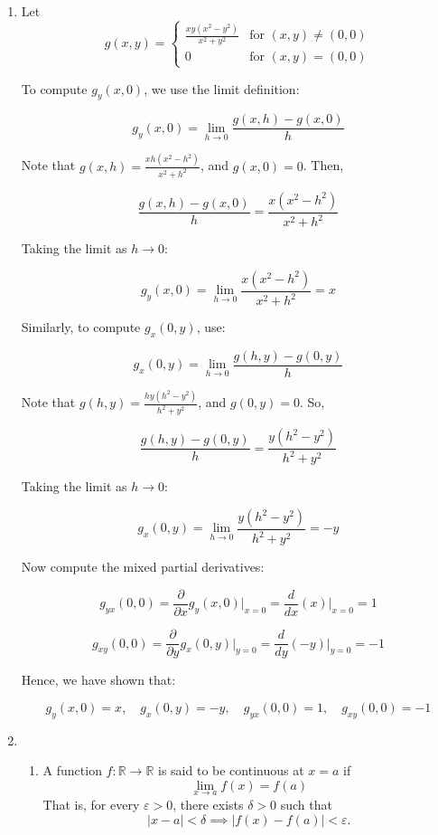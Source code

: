 \documentclass[12pt]{article}
\begin{document}
\begin{enumerate}
\item Let 
\[
g(x, y) = 
\begin{cases}
\frac{xy(x^2 - y^2)}{x^2 + y^2} & \text{for } (x, y) \neq (0, 0) \\
0 & \text{for } (x, y) = (0, 0)
\end{cases}
\]

To compute \( g_y(x, 0) \), we use the limit definition:

\[
g_y(x, 0) = \lim_{h \to 0} \frac{g(x,h) - g(x,0)}{h}
\]

Note that \( g(x, h) = \frac{x h (x^2 - h^2)}{x^2 + h^2} \), and \( g(x, 0) = 0 \). Then,

\[
\frac{g(x,h) - g(x,0)}{h} = \frac{x(x^2 - h^2)}{x^2 + h^2}
\]

Taking the limit as \( h \to 0 \):

\[
g_y(x, 0) = \lim_{h \to 0} \frac{x(x^2 - h^2)}{x^2 + h^2} = x
\]

Similarly, to compute \( g_x(0, y) \), use:

\[
g_x(0, y) = \lim_{h \to 0} \frac{g(h, y) - g(0, y)}{h}
\]

Note that \( g(h, y) = \frac{h y (h^2 - y^2)}{h^2 + y^2} \), and \( g(0, y) = 0 \). So,

\[
\frac{g(h,y) - g(0,y)}{h} = \frac{y(h^2 - y^2)}{h^2 + y^2}
\]

Taking the limit as \( h \to 0 \):

\[
g_x(0, y) = \lim_{h \to 0} \frac{y(h^2 - y^2)}{h^2 + y^2} = -y
\]

Now compute the mixed partial derivatives:

\[
g_{yx}(0, 0) = \frac{\partial}{\partial x} g_y(x, 0) \bigg|_{x = 0} = \frac{d}{dx}(x) \bigg|_{x = 0} = 1
\]

\[
g_{xy}(0, 0) = \frac{\partial}{\partial y} g_x(0, y) \bigg|_{y = 0} = \frac{d}{dy}(-y) \bigg|_{y = 0} = -1
\]

Hence, we have shown that:

\[
g_y(x, 0) = x, \quad g_x(0, y) = -y, \quad g_{yx}(0, 0) = 1, \quad g_{xy}(0, 0) = -1
\]
\item \begin{enumerate}
    \item

    A function \( f : \mathbb{R} \to \mathbb{R} \) is said to be continuous at \( x = a \) if
    \[
    \lim_{x \to a} f(x) = f(a)
    \]
    That is, for every \( \varepsilon > 0 \), there exists \( \delta > 0 \) such that
    \[
    |x - a| < \delta \implies |f(x) - f(a)| < \varepsilon.
    \]


\end{enumerate}
\end{enumerate}
\end{document}
